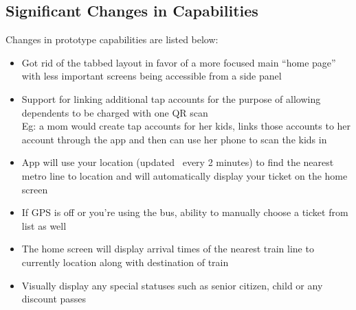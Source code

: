 \subsection{Significant Changes in Capabilities}
Changes in prototype capabilities are listed below:\begin{itemize}
	\item Got rid of the tabbed layout in favor of a more focused main “home page” with less important screens being accessible from a side panel
	\item Support for linking additional tap accounts for the purpose of allowing dependents to be charged with one QR scan\\
	Eg: a mom would create tap accounts for her kids, links those accounts to her account through the app and then can use her phone to scan the kids in 
	\item App will use your location (updated ~every 2 minutes) to find the nearest metro line to location and will automatically display your ticket on the home screen 
	\item If GPS is off or you're using the bus, ability to manually choose a ticket from list as well 
	\item The home screen will display arrival times of the nearest train line to currently location along with destination of train
	\item Visually display any special statuses such as senior citizen, child or any discount passes
\end{itemize}

\clearpage


